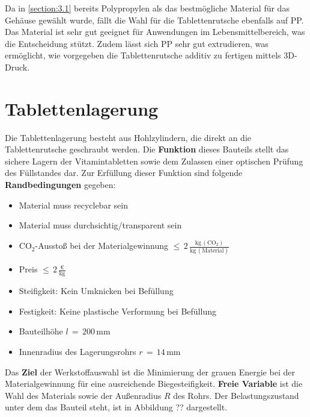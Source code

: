 Da in \ref{section:3.1} bereits Polypropylen als das bestmögliche Material für das Gehäuse gewählt wurde, fällt die Wahl für die Tablettenrutsche ebenfalls auf PP. Das Material ist sehr gut geeignet für Anwendungen im Lebensmittelbereich, was die Entscheidung stützt. Zudem lässt sich PP sehr gut extrudieren, was ermöglicht, wie vorgegeben die Tablettenrutsche additiv zu fertigen mittels 3D-Druck.

\section{Tablettenlagerung}
Die Tablettenlagerung besteht aus Hohlzylindern, die direkt an die Tablettenrutsche geschraubt werden. Die \textbf{Funktion} dieses Bauteils stellt das sichere Lagern der Vitamintabletten sowie dem Zulassen einer optischen Prüfung des Füllstandes dar. Zur Erfüllung dieser Funktion sind folgende \textbf{Randbedingungen} gegeben:
\begin{itemize}
	\item Material muss recyclebar sein
	\item Material muss durchsichtig/transparent sein
	\item CO$_2$-Ausstoß bei der Materialgewinnung $\le\,2\,\frac{\text{kg}\,(\text{CO}_2)}{\text{kg}\,(\text{Material})}$
	\item Preis $\le\,2\,\frac{\text{€}}{\text{kg}}$
	\item Steifigkeit: Kein Umknicken bei Befüllung
	\item Festigkeit: Keine plastische Verformung bei Befüllung
	\item Bauteilhöhe $l\,=\,200\,$mm
	\item Innenradius des Lagerungsrohrs $r\,=\,14\,$mm
\end{itemize}
Das \textbf{Ziel} der Werkstoffauswahl ist die Minimierung der grauen Energie bei der Materialgewinnung für eine ausreichende Biegesteifigkeit. \textbf{Freie Variable} ist die Wahl des Materials sowie der Außenradius $R$ des Rohrs. Der Belastungszustand unter dem das Bauteil steht, ist in Abbildung ?? dargestellt.
